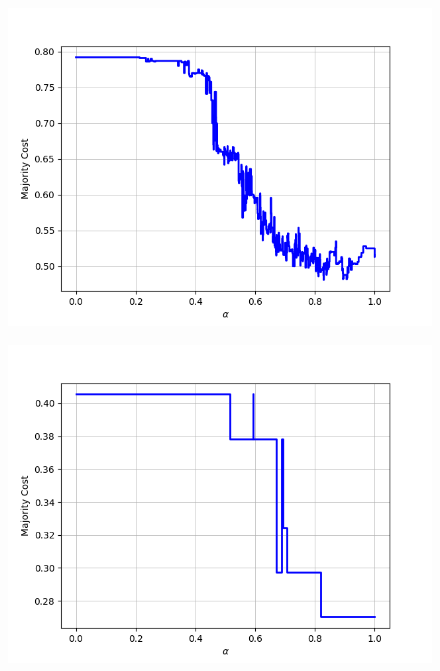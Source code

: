 \begin{figure}[h]
\begin{minipage}{.24\textwidth}
  {\includegraphics[width=\linewidth]{plots/nell-sc/person}}
\end{minipage}
\begin{minipage}{.24\textwidth}
  \centering
  {\includegraphics[width=\linewidth]{plots/nell-sc/personbylocation}}
\end{minipage}
\end{figure}
